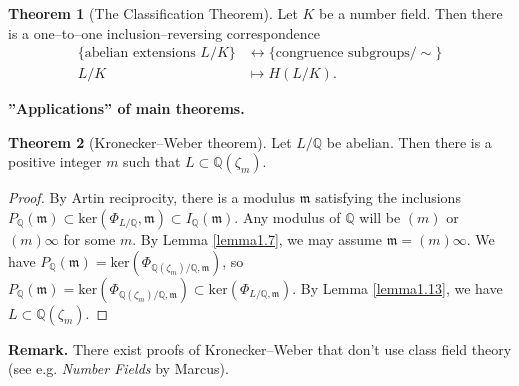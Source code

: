 \documentclass{article}
\theoremstyle{definition}
\newtheorem{theorem}{Theorem}[section]
\begin{document}
\begin{theorem}[The Classification Theorem]
    Let $K$ be a number field. Then there is a one--to--one inclusion--reversing correspondence 
    \begin{align*}
        \{\text{abelian extensions }L/K\} &\leftrightarrow \{\text{congruence subgroups}/\sim\}\\
        L/K &\mapsto H(L/K).
    \end{align*}
\end{theorem}
\textbf{''Applications'' of main theorems.}
\vspace{1mm}
 
\begin{theorem}[Kronecker--Weber theorem]
    Let $L/\mathbb{Q}$ be abelian. Then there is a positive integer $m$ such that $L \subset \mathbb{Q}(\zeta_m)$.
\end{theorem}
\begin{proof}
    By Artin reciprocity, there is a modulus $\mathfrak{m}$ satisfying the inclusions $P_{\mathbb{Q}}(\mathfrak{m}) \subset \text{ker}(\Phi_{L/\mathbb{Q}},\mathfrak{m}) \subset I_\mathbb{Q}(\mathfrak{m})$. Any modulus of $\mathbb{Q}$ will be $(m)$ or $(m)\infty$ for some $m$. By Lemma \ref{lemma1.7}, we may assume $\mathfrak{m} = (m)\infty$. We have $P_{\mathbb{Q}}(\mathfrak{m}) = \text{ker}(\Phi_{\mathbb{Q}(\zeta_m)/\mathbb{Q},\mathfrak{m}})$, so $P_{\mathbb{Q}}(\mathfrak{m}) = \text{ker}(\Phi_{\mathbb{Q}(\zeta_m)/\mathbb{Q},\mathfrak{m}}) \subset \text{ker}(\Phi_{L/\mathbb{Q},\mathfrak{m}})$. By Lemma \ref{lemma1.13}, we have $L \subset \mathbb{Q}(\zeta_m)$.
\end{proof}
\textbf{Remark.} There exist proofs of Kronecker--Weber that don't use class field theory (see e.g. \textit{Number Fields} by Marcus).
\vspace{1mm}
 
\end{document}
